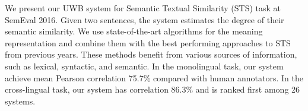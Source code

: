 We present our UWB system for Semantic Textual Similarity (STS) task at SemEval 2016. Given two sentences, the system estimates the degree of their semantic similarity. We use state-of-the-art algorithms for the meaning representation and combine them with the best performing approaches to STS from previous years. These methods benefit from various sources of information, such as lexical, syntactic, and semantic. In the monolingual task, our system achieve mean Pearson correlation 75.7\% compared with human annotators. In the cross-lingual task, our system has correlation 86.3\% and is ranked first among 26 systems.
